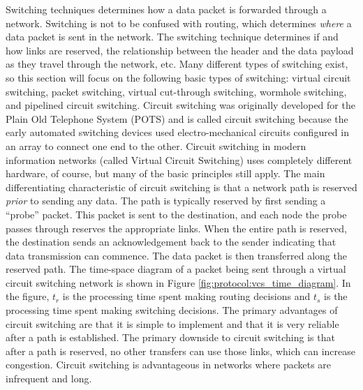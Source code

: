 Switching techniques determines how a data packet is forwarded through a network. Switching is not to be confused with routing, which determines \emph{where} a data packet is sent in the network. The switching technique determines if and how links are reserved, the relationship between the header and the data payload as they travel through the network, etc. Many different types of switching exist, so this section will focus on the following basic types of switching: virtual circuit switching, packet switching, virtual cut-through switching, wormhole switching, and pipelined circuit switching.
Circuit switching was originally developed for the Plain Old Telephone System (POTS) and is called circuit switching because the early automated switching devices used electro-mechanical circuits configured in an array to connect one end to the other. Circuit switching in modern information networks (called Virtual Circuit Switching) uses completely different hardware, of course, but many of the basic principles still apply. The main differentiating characteristic of circuit switching is that a network path is reserved \emph{prior} to sending any data. The path is typically reserved by first sending a ``probe'' packet. This packet is sent to the destination, and each node the probe passes through reserves the appropriate links. When the entire path is reserved, the destination sends an acknowledgement back to the sender indicating that data transmission can commence. The data packet is then transferred along the reserved path. The time-space diagram of a packet being sent through a virtual circuit switching network is shown in Figure \ref{fig:protocol:vcs_time_diagram}. In the figure, $t_r$ is the processing time spent making routing decisions and $t_s$ is the processing time spent making switching decisions. The primary advantages of circuit switching are that it is simple to implement and that it is very reliable after a path is established. The primary downside to circuit switching is that after a path is reserved, no other transfers can use those links, which can increase congestion. Circuit switching is advantageous in networks where packets are infrequent and long. \cite{ref:1997-duato-interconnection_networks}

